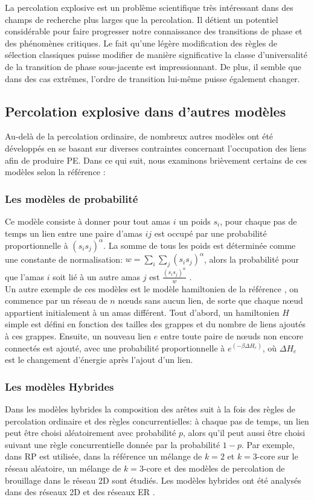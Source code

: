 La percolation explosive est un problème scientifique très intéressant dans des champs de recherche plus larges que la percolation. Il détient un potentiel considérable pour faire progresser notre connaissance des transitions de phase et des phénomènes critiques. Le fait qu'une légère modification des règles de sélection classiques puisse modifier de manière significative la classe d'universalité de la transition de phase sous-jacente est impressionnant. De plus, il semble que dans des cas extrêmes, l'ordre de transition lui-même puisse également changer.

\subsection{Percolation explosive dans d'autres modèles}
Au-delà de la percolation ordinaire, de nombreux autres modèles ont été développés en se basant sur diverses contraintes concernant l'occupation des liens afin de produire PE. Dans ce qui suit, nous examinons brièvement certains de ces modèles selon la référence \cite{Boccaletti-al2016}: 
\subsubsection{Les modèles de probabilité}
Ce modèle consiste à donner pour tout amas $i$ un poids $s_i$, pour chaque pas de temps un lien entre une paire d'amas $ij$ est occupé par une probabilité proportionnelle à $(s_is_j)^{\alpha}$. La somme  de tous les poids est déterminée comme une constante de normalisation: $w=\sum_i\sum_j(s_is_j)^{\alpha}$, alors la probabilité pour que l'amas $i$ soit lié à un autre amas $j$ est $\frac{(s_is_j)^{\alpha}}{w}$ \cite{Cho-al2010}.\\ Un autre exemple de ces modèles est le modèle hamiltonien de la référence \cite{Moreira-al2010}, on commence par un réseau de $n$ nœuds sans aucun lien, de sorte que chaque nœud appartient initialement à un amas différent. Tout d'abord, un hamiltonien $H$ simple est défini en fonction des tailles des grappes et du nombre de liens ajoutés à ces grappes. Ensuite, un nouveau lien $e$ entre toute paire de nœuds non encore connectés est ajouté, avec une probabilité proportionnelle à $e^{(-\beta\Delta H_e)}$, où $\Delta H_e$ est le changement d'énergie après l'ajout d'un lien.

\subsubsection{Les modèles Hybrides}
Dans les modèles hybrides la composition des arêtes suit à la fois des règles de percolation ordinaire et des règles concurrentielles: à chaque pas de temps, un lien peut être choisi aléatoirement avec probabilité $p$, alors qu'il peut aussi être choisi suivant une règle concurrentielle donnée par la probabilité $1-p$. Par exemple, dans \cite{Bastas-al2014} RP est utilisée, dans la référence \cite{Cao-Schwarz2012} un mélange de $k=2$ et $k=3$-core sur le réseau aléatoire, un mélange de $k=3$-core et des modèles de percolation de brouillage dans le réseau 2D sont étudiés. Les modèles hybrides ont été analysés dans des réseaux 2D \cite{Cao-Schwarz2012,Bastas-al2014} et des réseaux ER  \cite{Cao-Schwarz2012,Bastas-al2014,Fan-al2012}.

